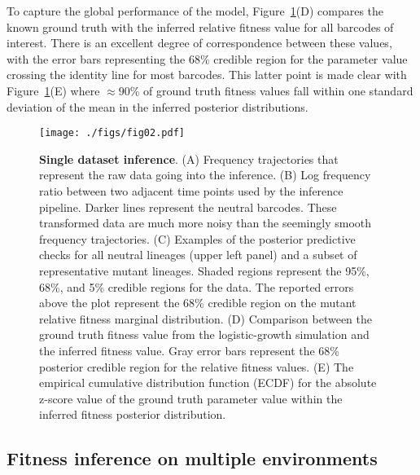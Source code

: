 \documentclass[
]{scrartcl}
\begin{document}
\begin{refsegment}
To capture the global performance of the model, Figure~\ref{fig-02}(D)
compares the known ground truth with the inferred relative fitness value
for all barcodes of interest. There is an excellent degree of
correspondence between these values, with the error bars representing
the 68\% credible region for the parameter value crossing the identity
line for most barcodes. This latter point is made clear with
Figure~\ref{fig-02}(E) where \(\approx 90\%\) of ground truth fitness
values fall within one standard deviation of the mean in the inferred
posterior distributions.

\begin{figure}

{\centering \texttt{[image: ./figs/fig02.pdf]}

}

\caption{\label{fig-02}\textbf{Single dataset inference}. (A) Frequency
trajectories that represent the raw data going into the inference. (B)
Log frequency ratio between two adjacent time points used by the
inference pipeline. Darker lines represent the neutral barcodes. These
transformed data are much more noisy than the seemingly smooth frequency
trajectories. (C) Examples of the posterior predictive checks for all
neutral lineages (upper left panel) and a subset of representative
mutant lineages. Shaded regions represent the 95\%, 68\%, and 5\%
credible regions for the data. The reported errors above the plot
represent the 68\% credible region on the mutant relative fitness
marginal distribution. (D) Comparison between the ground truth fitness
value from the logistic-growth simulation and the inferred fitness
value. Gray error bars represent the 68\% posterior credible region for
the relative fitness values. (E) The empirical cumulative distribution
function (ECDF) for the absolute z-score value of the ground truth
parameter value within the inferred fitness posterior distribution.}

\end{figure}

\hypertarget{sec-multienv}{%
\subsection{Fitness inference on multiple
environments}\label{sec-multienv}}


\end{refsegment}
\end{document}
